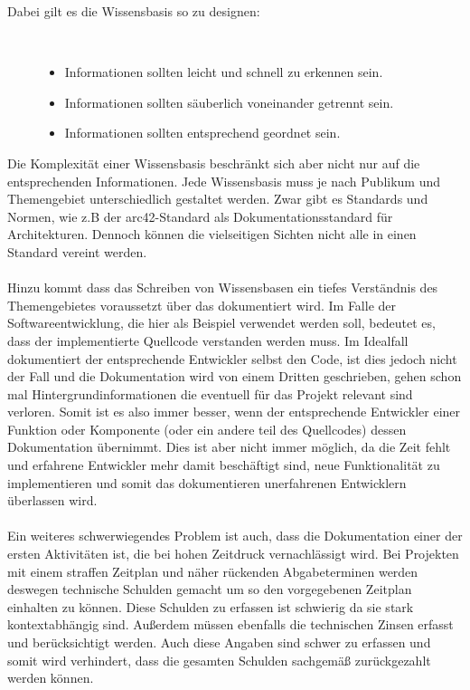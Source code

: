 \documentclass[a4paper,12pt]{scrartcl}
\begin{document}
\begin{description}
   \item[Dabei gilt es die Wissensbasis so zu designen:]~\par
   \begin{itemize}
      \item Informationen sollten leicht und schnell zu erkennen sein.
      \item Informationen sollten säuberlich voneinander getrennt sein. 
      \item Informationen sollten entsprechend geordnet sein.
   \end{itemize}
\end{description}
Die Komplexität einer Wissensbasis beschränkt sich aber nicht nur auf die entsprechenden Informationen. Jede Wissensbasis muss je nach Publikum und Themengebiet unterschiedlich gestaltet werden. Zwar gibt es Standards und Normen, wie z.B der arc42-Standard als Dokumentationsstandard für Architekturen. Dennoch können die vielseitigen Sichten nicht alle in einen Standard vereint werden.
\\\\
Hinzu kommt dass das Schreiben von Wissensbasen ein tiefes Verständnis des Themengebietes voraussetzt über das dokumentiert wird. Im Falle der Softwareentwicklung, die hier als Beispiel verwendet werden soll, bedeutet es, dass der implementierte Quellcode verstanden werden muss. Im Idealfall dokumentiert der entsprechende Entwickler selbst den Code, ist dies jedoch nicht der Fall und die Dokumentation wird von einem Dritten geschrieben, gehen schon mal Hintergrundinformationen die eventuell für das Projekt relevant sind verloren. Somit ist es also immer besser, wenn der entsprechende Entwickler einer Funktion oder Komponente (oder ein andere teil des Quellcodes) dessen Dokumentation übernimmt. Dies ist aber nicht immer möglich, da die Zeit fehlt und erfahrene Entwickler mehr damit beschäftigt sind, neue Funktionalität zu implementieren und somit das dokumentieren unerfahrenen Entwicklern überlassen wird. 
\\\\ 
Ein weiteres schwerwiegendes Problem ist auch, dass die Dokumentation einer der ersten Aktivitäten ist, die bei hohen Zeitdruck vernachlässigt wird. Bei Projekten mit einem straffen Zeitplan und näher rückenden Abgabeterminen werden deswegen technische Schulden gemacht um so den vorgegebenen Zeitplan einhalten zu können. Diese Schulden zu erfassen ist schwierig da sie stark kontextabhängig sind. Außerdem müssen ebenfalls die technischen Zinsen erfasst und berücksichtigt werden. Auch diese Angaben sind schwer zu erfassen und somit wird verhindert, dass die gesamten Schulden sachgemäß zurückgezahlt werden können.
\end{document}
